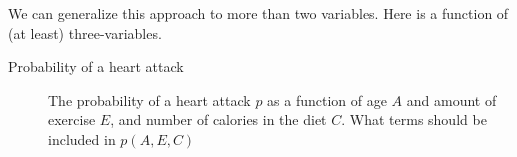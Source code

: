 We can generalize this approach to more than two variables.  Here is a
function of (at least) three-variables.

\begin{description}

\item[Probability of a heart attack] The probability of a heart attack
  $p$ as a function of age $A$ and amount of exercise $E$, and number
  of calories in the diet $C$. What terms should be included in $p(A,E,C)$

\end{description}

